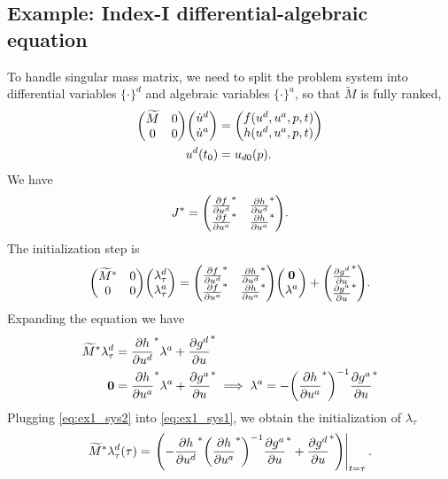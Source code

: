 \documentclass[a4paper,9pt]{article}
\theoremstyle{definition}
\theoremstyle{remark}
\begin{document}
\subsection{Example: Index-I differential-algebraic equation}
To handle singular mass matrix, we need to split the problem system into
differential variables $\{\cdot\}^d$ and algebraic
variables $\{\cdot\}^a$, so that $\widetilde{M}$ is fully ranked,
\begin{align}
  \mqty(\widetilde{M} & 0 \\ 0 & 0) \mqty(\dot{u}^d\\ \dot{u}^a) &= \mqty(f(u^d,
  u^a, p, t)
  \\ h(u^d, u^a, p, t)) \\
  u^d(t_0) &= u_{d0}(p).
\end{align}
We have
\begin{equation}
  J^* = \mqty(\pdv{f}{u^d}^* & \pdv{h}{u^d}^* \\ \pdv{f}{u^a}^* &
  \pdv{h}{u^a}^*).
\end{equation}
The initialization step is
\begin{equation}
  \mqty(\widetilde{M}^* & 0 \\ 0 & 0) \mqty(\lambda_\tau^d\\ \lambda_\tau^a) =
  \mqty(\pdv{f}{u^d}^* & \pdv{h}{u^d}^* \\ \pdv{f}{u^a}^* &
  \pdv{h}{u^a}^*) \mqty(\bm{0}\\ \lambda^a) + \mqty(\pdv{g^d}{u}^* \\
  \pdv{g^a}{u}^*).
\end{equation}
Expanding the equation we have
\begin{align}
  \widetilde{M}^* \lambda_\tau^d &= \pdv{h}{u^d}^* \lambda^a + \pdv{g^d}{u}^*
  \label{eq:ex1_sys1} \\
  \bm{0} &= \pdv{h}{u^a}^* \lambda^a + \pdv{g^a}{u}^* \implies
  \lambda^a = -\qty(\pdv{h}{u^a}^*)^{-1}\pdv{g^a}{u}^* \label{eq:ex1_sys2}
\end{align}
Plugging \cref{eq:ex1_sys2} into \cref{eq:ex1_sys1}, we obtain the
initialization of $\lambda_\tau$
\begin{equation}
  \widetilde{M}^* \lambda_\tau^d(\tau) = \eval{\qty(-\pdv{h}{u^d}^*
    \qty(\pdv{h}{u^a}^*)^{-1}\pdv{g^a}{u}^* +
  \pdv{g^d}{u}^*)}_{t=\tau}.
\end{equation}
\end{document}
